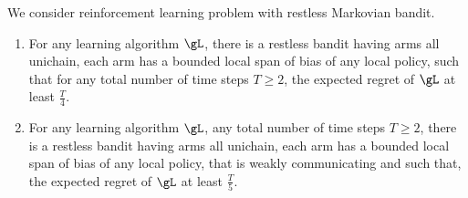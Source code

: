 \begin{thm}
    \label{thm:non_learnable}
    We consider reinforcement learning problem with restless Markovian bandit.
    \begin{enumerate}[label=(\roman*)]
        \item \label{it:non_learnable1} For any learning algorithm $\gL$, there is a restless bandit having arms all unichain, each arm has a bounded local span of bias of any local policy, such that for any total number of time steps $T\ge2$, the expected regret of $\gL$ at least $\frac{T}4$.
        \item \label{it:non_learnable2} For any learning algorithm $\gL$, any total number of time steps $T\ge2$, there is a restless bandit having arms all unichain, each arm has a bounded local span of bias of any local policy, that is weakly communicating and such that, the expected regret of $\gL$ at least $\frac{T}5$.
    \end{enumerate}
\end{thm}
